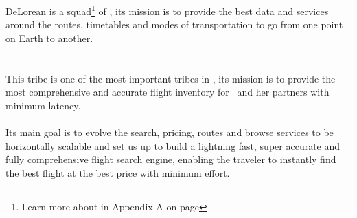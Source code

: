 
\section{\squad}

DeLorean\cite{delorean_squad_home} is a squad\footnote{Learn more about \textit{} in Appendix A on page \pageref{appendix_a}} of \tribe, its mission is to provide the best data and services around the routes, timetables and modes of transportation to go from one point on Earth to another.


\section{\tribe}

This tribe\cite{marketplace_engine_home} is one of the most important tribes in \company, its mission is to provide the most comprehensive and accurate flight inventory for \company\ and her partners with minimum latency.
\\\\
Its main goal is to evolve the search, pricing, routes and browse services to be horizontally scalable and set us up to build a lightning fast, super accurate and fully comprehensive flight search engine, enabling the traveler to instantly find the best flight at the best price with minimum effort.

